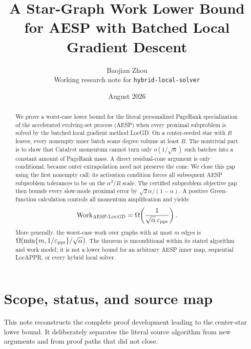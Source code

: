 \documentclass[11pt]{article}
\title{A Star-Graph Work Lower Bound for AESP with Batched Local Gradient Descent}
\author{Baojian Zhou\\
\small Working research note for \texttt{hybrid-local-solver}}
\date{August 2026}
\begin{document}
\maketitle

\begin{abstract}
We prove a worst-case lower bound for the literal personalized PageRank
specialization of the accelerated evolving-set process (AESP) when every
proximal subproblem is solved by the batched local gradient method LocGD.  On
a center-seeded star with $B$ leaves, every nonempty inner batch scans degree
volume at least $B$.  The nontrivial part is to show that Catalyst momentum
cannot turn only $o(1/\sqrt{\alpha})$ such batches into a constant amount of
PageRank mass.  A direct residual-cone argument is only conditional, because
outer extrapolation need not preserve the cone.  We close this gap using the
first nonempty call: its activation condition forces all subsequent AESP
subproblem tolerances to be on the $\alpha^2/B$ scale.  The certified
subproblem objective gap then bounds every slow-mode proximal error by
$\sqrt{2}\alpha/(1-\alpha)$.  A positive Green-function calculation controls
all momentum amplification and yields
\[
  \operatorname{Work}_{\textsc{AESP}\text{-}\textsc{LocGD}}
  =\Omega\!\left(\frac{1}{\sqrt{\alpha}\,\varepsilon_{\mathrm{ppr}}}\right).
\]
More generally, the worst-case work over graphs with at most $m$ edges is
$\Omega(\min\{m,1/\varepsilon_{\mathrm{ppr}}\}/\sqrt{\alpha})$.  The theorem is unconditional
within its stated algorithm and work model; it is not a lower bound for an
arbitrary AESP inner map, sequential LocAPPR, or every hybrid local solver.
\end{abstract}

\tableofcontents

\section{Scope, status, and source map}
\label{sec:scope}

This note reconstructs the complete proof development leading to the
center-star lower bound.  It deliberately separates the literal source
algorithm from new arguments and from proof paths that did not close.
\end{document}
